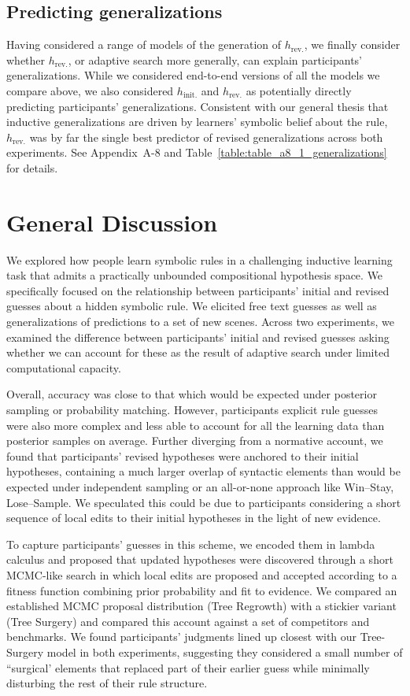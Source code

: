 \documentclass[doc,natbib,floatsintext]{apa7}
\newcommand{\hr}{h_{\mathrm{rev.}}}
\newcommand{\hi}{h_{\mathrm{init.}}}
\begin{document}
\subsection{Predicting generalizations}

Having considered a range of models of the generation of $\hr$, we finally consider whether $\hr$, or adaptive search more generally, can explain participants' generalizations. While we considered end-to-end versions of all the models we compare above, we also considered $\hi$ and $\hr$ as potentially directly predicting participants' generalizations. Consistent with our general thesis that inductive generalizations are driven by learners' symbolic belief about the rule, $\hr$ was by far the single best predictor of revised generalizations across both experiments. See Appendix~A-8 and Table~\ref{table:table_a8_1_generalizations} for details. 


\section{General Discussion}

We explored how people learn symbolic rules in a challenging inductive learning task that admits a practically unbounded compositional hypothesis space. We specifically focused on the relationship between participants’ initial and revised guesses about a hidden symbolic rule. We elicited free text guesses as well as generalizations of predictions to a set of new scenes. Across two experiments, we examined the difference between participants' initial and revised guesses asking whether we can account for these as the result of adaptive search under limited computational capacity. 

Overall, accuracy was close to that which would be expected under posterior sampling or probability matching. However, participants explicit rule guesses were also more complex and less able to account for all the learning data than posterior samples on average. Further diverging from a normative account, we found that participants' revised hypotheses were anchored to their initial hypotheses, containing a much larger overlap of syntactic elements than would be expected under independent sampling or an all-or-none approach like Win--Stay, Lose--Sample. We speculated this could be due to participants considering a short sequence of local edits to their initial hypotheses in the light of new evidence.

To capture participants' guesses in this scheme, we encoded them in lambda calculus and proposed that updated hypotheses were discovered through a short MCMC-like search in which local edits are proposed and accepted according to a fitness function combining prior probability and fit to evidence. We compared an established MCMC proposal distribution (Tree Regrowth) with a stickier variant (Tree Surgery) and compared this account against a set of competitors and benchmarks. We found participants' judgments lined up closest with our Tree-Surgery model in both experiments, suggesting they considered a small number of ``surgical' elements that replaced part of their earlier guess while minimally disturbing the rest of their rule structure.
\end{document}
